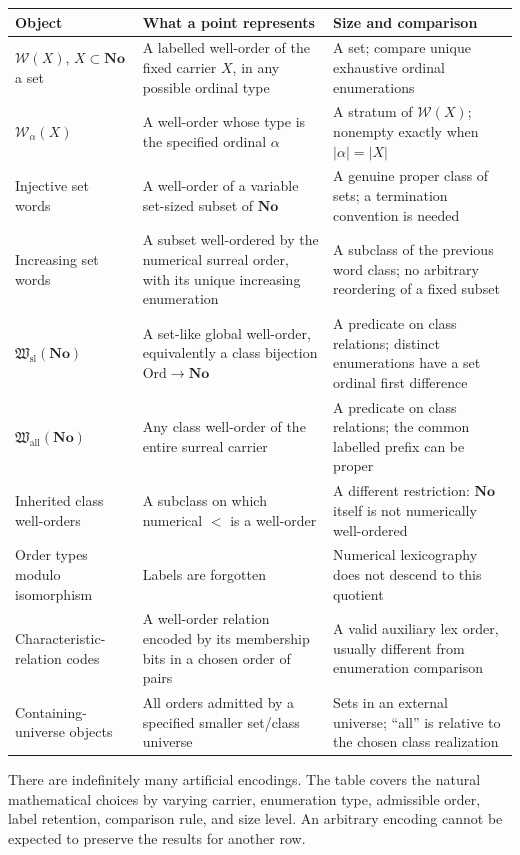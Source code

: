 \documentclass[11pt]{article}
\theoremstyle{definition}
\theoremstyle{remark}
\newcommand{\No}{\mathbf{No}}
\newcommand{\Ord}{\mathrm{Ord}}
\newcommand{\WO}{\mathcal W}
\newcommand{\Hsl}{\mathfrak W_{\mathrm{sl}}}
\newcommand{\Hall}{\mathfrak W_{\mathrm{all}}}
\begin{document}
\begin{longtable}{@{}>{\raggedright\arraybackslash}p{}>{\raggedright\arraybackslash}p{}>{\raggedright\arraybackslash}p{}@{}}
\toprule
Object & What a point represents & Size and comparison\\
\midrule
\endhead
$\WO(X)$, $X\subset\No$ a set & A labelled well-order of the fixed carrier
$X$, in any possible ordinal type & A set; compare unique exhaustive
ordinal enumerations\\[4pt]
$\WO_\alpha(X)$ & A well-order whose type is the specified ordinal
$\alpha$ & A stratum of $\WO(X)$; nonempty exactly when
$|\alpha|=|X|$\\[4pt]
Injective set words & A well-order of a variable set-sized subset of
$\No$ & A genuine proper class of sets; a termination convention is needed\\[4pt]
Increasing set words & A subset well-ordered by the numerical surreal
order, with its unique increasing enumeration & A subclass of the previous
word class; no arbitrary reordering of a fixed subset\\[4pt]
$\Hsl(\No)$ & A set-like global well-order, equivalently a class bijection
$\Ord\to\No$ & A predicate on class relations; distinct enumerations have
a set ordinal first difference\\[4pt]
$\Hall(\No)$ & Any class well-order of the entire surreal carrier & A
predicate on class relations; the common labelled prefix can be proper\\[4pt]
Inherited class well-orders & A subclass on which numerical $<$ is a
well-order & A different restriction: $\No$ itself is not numerically
well-ordered\\[4pt]
Order types modulo isomorphism & Labels are forgotten & Numerical
lexicography does not descend to this quotient\\[4pt]
Characteristic-relation codes & A well-order relation encoded by its
membership bits in a chosen order of pairs & A valid auxiliary lex order,
usually different from enumeration comparison\\[4pt]
Containing-universe objects & All orders admitted by a specified smaller
set/class universe & Sets in an external universe; ``all'' is relative to
the chosen class realization\\
\bottomrule
\end{longtable}

There are indefinitely many artificial encodings. The table covers the
natural mathematical choices by varying carrier, enumeration type,
admissible order, label retention, comparison rule, and size level. An
arbitrary encoding cannot be expected to preserve the results for another
row.
\end{document}
